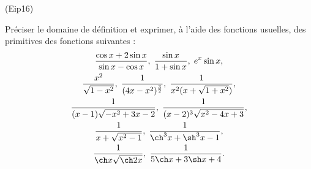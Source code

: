 \begin{tiny}(Eip16)\end{tiny}
Pr{\'e}ciser le domaine de d{\'e}finition et exprimer, {\`a} l'aide des fonctions usuelles, des primitives des fonctions suivantes :
\begin{multline*}
\frac{\cos x+2\sin x}{\sin x-\cos x},\; \frac{\sin x}{1+\sin x},\; e^{x}\sin x, \\
\frac{x^{2}}{\sqrt{1-x^{2}}},\;
\frac{1}{(4x - x^{2})^{\frac{3}{2}}}, \;
\frac{1}{x^{2}(x + \sqrt{1 + x^{2}})}, \\
\frac{1}{(x - 1)\sqrt{-x^{2} + 3x - 2}},\;
\frac{1}{(x - 2)^{3}\sqrt{x^{2} - 4x + 3}}, \\
\frac{1}{x + \sqrt{x^{2} - 1}},\;
\frac{1}{\ch ^{3}x + \sh ^{3}x - 1}, \\
\frac{1}{\ch x \sqrt{\ch 2x}},\; \frac{1}{5\ch x + 3\sh x + 4}. 
\end{multline*}
